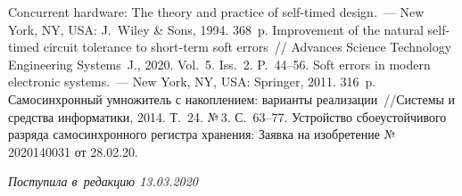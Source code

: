 \begin{multicols}{2}
{{\begin{thebibliography}{9}
 \vspace*{-2pt}
  
   Concurrent hardware: The 
theory and practice of self-timed design.~--- New York, NY, USA: J.~Wiley \& Sons, 1994. 368~p.
   Improvement of the natural self-timed circuit tolerance to short-term soft errors~// 
Advances Science Technology Engineering Systems~J., 2020. Vol.~5. Iss.~2. P.~44--56.
   Soft errors in modern electronic systems.~--- New York, NY, USA: Springer, 
2011. 316~p.
   Самосинхронный умножитель с 
накоплением: варианты реализации~//\linebreak Системы и средства информатики, 2014. Т.~24. №\,3. 
С.~63--77.
 Устройство сбоеустойчивого разряда самосинхронного регистра хранения: Заявка на 
изобретение №\,2020140031 от 28.02.20.
\end{thebibliography}

 }
 }

\end{multicols}

\vspace*{-8pt}

\hfill{\small\textit{Поступила в~редакцию 13.03.2020}}




\newpage

\vspace*{-28pt}





\def\tit{IMPROVEMENT OF SELF-TIMED CIRCUIT SOFT ERROR TOLERANCE}


\def\titkol{Improvement of self-time circuit soft error tilerance}


\def\aut{I.\,A.~Sokolov, Yu.\,A.~Stepchenkov, Yu.\,G.~Diachenko, 
and~Yu.\,V.~Rogdestvenski}

